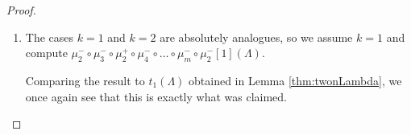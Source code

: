 \documentclass[10pt,a4paper]{amsart}
\begin{document}
\begin{proof}
\begin{enumerate}
    \begin{figure}[H]
  
\end{figure}

\noindent Same as in the previous case, by Lemma \ref{thm:twonLambda} this is exactly $t_3(\Lambda)$.
    \item The cases $k=1$ and $k=2$ are absolutely analogues, so we assume $k=1$ and compute ${\mu_{2}^- \circ \mu_{3}^- \circ \mu_{2}^+ \circ \mu_4^- \circ \dots \circ \mu_m^- \circ \mu_{2}^-[1](\Lambda)}$. 
     \begin{figure}[H] 
   
  \end{figure}
  \noindent Comparing the result to $t_1(\Lambda)$ obtained in Lemma \ref{thm:twonLambda}, we once again see that this is exactly what was claimed. 
\end{enumerate}
\end{proof} 
\end{document}
